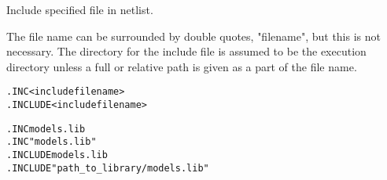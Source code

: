 


Include specified file in netlist.

The file name can be surrounded by double quotes, "filename", but this
is not necessary.  The directory for the include file is assumed to be
the execution directory unless a full or relative path is given as a
part of the file name.

\begin{Command}
\format
\begin{alltt}
.INC <include file name>
.INCLUDE <include file name>
\end{alltt}

\examples
\begin{alltt}
.INC models.lib
.INC "models.lib"
.INCLUDE models.lib
.INCLUDE "path\_to\_library/models.lib"
\end{alltt}

\end{Command}
